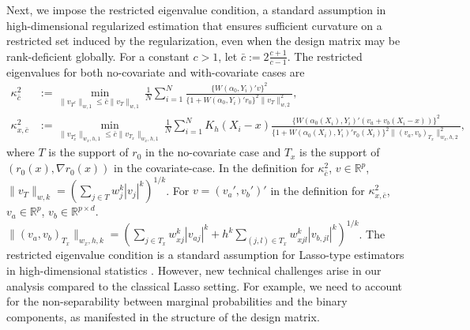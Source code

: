 \documentclass[11pt]{article}
\begin{document}
Next, we impose the restricted eigenvalue condition, a standard assumption in high-dimensional regularized estimation that ensures sufficient curvature on a restricted set induced by the regularization, even when the design matrix may be rank-deficient globally. For a constant $c>1$, let $\bar c:=2\frac{c+1}{c-1}$. The restricted eigenvalues for both no-covariate and with-covariate cases are
$$\begin{array}{rl}
\kappa_{\bar{c}}^2 &\displaystyle := \min_{\|v_{T^c}\|_{w,1} \leq \bar{c}\|v_T\|_{w,1}} \frac{1}{N}\sum_{i=1}^N \frac{\{W(\alpha_0,Y_i)'v\}^2}{\{1+W(\alpha_0,Y_i)'r_0\}^2\|v_T\|_{w,2}^2},\\ 
\kappa_{x,\bar c}^2 &\displaystyle := \min_{\|v_{T_x^c}\|_{w_x,h,1} \leq \bar{c}\|v_{T_x}\|_{w_x,h,1}} \frac{1}{N}\sum_{i=1}^N K_h(X_i-x) \frac{\{W(\alpha_0(X_i),Y_i)'(v_a+v_b(X_i-x))\}^2}{ \{1+W(\alpha_0(X_i),Y_i)'r_0(X_i)\}^2\|(v_a,v_b)_{T_x}\|_{w_x,h,2}^2},
\end{array}$$
where $T$ is the support of $r_0$ in the no-covariate case and $T_x$ is the support of $(r_0(x),\nabla r_0(x))$ in the covariate-case. In the definition for $\kappa_{\bar{c}}^2$, $v\in\mathbb{R}^p$, $\|v_T\|_{w,k}= (\sum_{j\in T} w_j^k|v_j|^k)^{1/k}$. For $v=(v_a',v_b')'$ in the definition for $\kappa_{x,\bar{c}}^2$, $v_a\in\mathbb{R}^p$, $v_b\in\mathbb{R}^{p\times d}$. $\|(v_a,v_b)_{T_x}\|_{w_x,h,k}=\left(\sum_{j\in T_x}w_{xj}^k|v_{aj}|^k+h^k\sum_{(j,l)\in T_x}w_{xjl}^k|v_{b,jl}|^k\right)^{1/k}$. The restricted eigenvalue condition is a standard assumption for Lasso-type estimators in high-dimensional statistics \citep{bickel2009simultaneous,buhlmann2011statistics}. However, new technical challenges arise in our analysis compared to the classical Lasso setting. For example, we need to account for the non-separability between marginal probabilities and the binary components, as manifested in the structure of the design matrix. 
\end{document}
